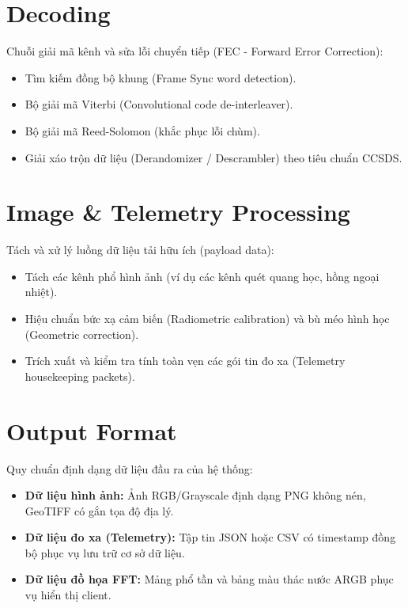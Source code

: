 \documentclass[11pt,a4paper]{article}
\begin{document}
\section{Decoding}
Chuỗi giải mã kênh và sửa lỗi chuyển tiếp (FEC - Forward Error Correction):
\begin{itemize}
    \item Tìm kiếm đồng bộ khung (Frame Sync word detection).
    \item Bộ giải mã Viterbi (Convolutional code de-interleaver).
    \item Bộ giải mã Reed-Solomon (khắc phục lỗi chùm).
    \item Giải xáo trộn dữ liệu (Derandomizer / Descrambler) theo tiêu chuẩn CCSDS.
\end{itemize}

\section{Image \& Telemetry Processing}
Tách và xử lý luồng dữ liệu tải hữu ích (payload data):
\begin{itemize}
    \item Tách các kênh phổ hình ảnh (ví dụ các kênh quét quang học, hồng ngoại nhiệt).
    \item Hiệu chuẩn bức xạ cảm biến (Radiometric calibration) và bù méo hình học (Geometric correction).
    \item Trích xuất và kiểm tra tính toàn vẹn các gói tin đo xa (Telemetry housekeeping packets).
\end{itemize}

\section{Output Format}
Quy chuẩn định dạng dữ liệu đầu ra của hệ thống:
\begin{itemize}
    \item \textbf{Dữ liệu hình ảnh:} Ảnh RGB/Grayscale định dạng PNG không nén, GeoTIFF có gắn tọa độ địa lý.
    \item \textbf{Dữ liệu đo xa (Telemetry):} Tập tin JSON hoặc CSV có timestamp đồng bộ phục vụ lưu trữ cơ sở dữ liệu.
    \item \textbf{Dữ liệu đồ họa FFT:} Mảng phổ tần và bảng màu thác nước ARGB phục vụ hiển thị client.
\end{itemize}
\end{document}

